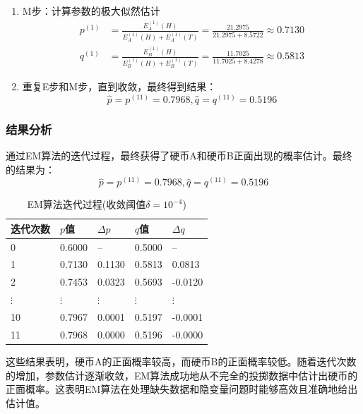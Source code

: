 \documentclass[a4paper,12pt]{ctexart} %
\begin{document}
\begin{enumerate}
    \item M步：计算参数的极大似然估计
    \begin{align*}
    p^{(1)} &= \frac{E^{(1)}_A(H)}{E^{(1)}_A(H) + E^{(1)}_A(T)} = \frac{21.2975}{21.2975+8.5722} \approx 0.7130 \\
    q^{(1)} &= \frac{E^{(1)}_B(H)}{E^{(1)}_B(H) + E^{(1)}_B(T)} = \frac{11.7025}{11.7025+8.4278} \approx 0.5813 
    \end{align*}

    \item 重复E步和M步，直到收敛，最终得到结果：
    \begin{equation*}
    \hat{p} = p^{(11)} = 0.7968, \hat{q} = q^{(11)} = 0.5196
    \end{equation*}
\end{enumerate}

\subsubsection{结果分析}
通过EM算法的迭代过程，最终获得了硬币A和硬币B正面出现的概率估计。最终的结果为：
\begin{equation*}
    \hat{p} = p^{(11)} = 0.7968, \hat{q} = q^{(11)} = 0.5196
\end{equation*}

\begin{table}[htbp]
    \centering
    \caption{EM算法迭代过程(收敛阈值$\delta=10^{-4}$)}
    \begin{tabular}{p{2cm}p{2cm}p{2cm}p{2cm}p{2cm}}
    \toprule
    \textbf{迭代次数} & \textbf{$p$值} & \textbf{$\Delta p$} & \textbf{$q$值} & \textbf{$\Delta q$} \\
    \midrule
    0 & 0.6000 & -- & 0.5000 & -- \\
    1 & 0.7130 & 0.1130 & 0.5813 & 0.0813 \\
    2 & 0.7453 & 0.0323 & 0.5693 & -0.0120 \\
    $\vdots$ & $\vdots$ & $\vdots$ & $\vdots$ & $\vdots$ \\
    10 & 0.7967 & 0.0001 & 0.5197 & -0.0001 \\
    11 & 0.7968 & 0.0000 & 0.5196 & -0.0000 \\
    \bottomrule
    \end{tabular}
\end{table}
这些结果表明，硬币A的正面概率较高，而硬币B的正面概率较低。随着迭代次数的增加，参数估计逐渐收敛，EM算法成功地从不完全的投掷数据中估计出硬币的正面概率。这表明EM算法在处理缺失数据和隐变量问题时能够高效且准确地给出估计值。
\end{document}
